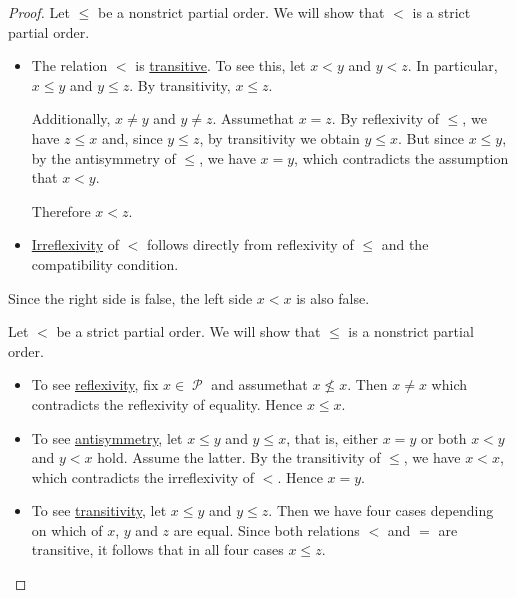 \begin{proof}
   Let \( \leq \) be a nonstrict partial order. We will show that \( < \) is a strict partial order.

  \begin{itemize}
    \item The relation \( < \) is \hyperref[def:binary_relation/transitive]{transitive}. To see this, let \( x < y \) and \( y < z \). In particular, \( x \leq y \) and \( y \leq z \). By transitivity, \( x \leq z \).

    Additionally, \( x \neq y \) and \( y \neq z \). Assume\DNE that \( x = z \). By reflexivity of \( \leq \), we have \( z \leq x \) and, since \( y \leq z \), by transitivity we obtain \( y \leq x \). But since \( x \leq y \), by the antisymmetry of \( \leq \), we have \( x = y \), which contradicts the assumption that \( x < y \).

    Therefore \( x < z \).

    \item \hyperref[def:binary_relation/irreflexive]{Irreflexivity} of \( < \) follows directly from reflexivity of \( \leq \) and the compatibility condition.
  \end{itemize}

  Since the right side is false, the left side \( x < x \) is also false.

   Let \( < \) be a strict partial order. We will show that \( \leq \) is a nonstrict partial order.

  \begin{itemize}
    \item To see \hyperref[def:binary_relation/reflexive]{reflexivity}, fix \( x \in \mscrP \) and assume\DNE that \( x \not\leq x \). Then \( x \neq x \) which contradicts the reflexivity of equality. Hence \( x \leq x \).

    \item To see \hyperref[def:binary_relation/antisymmetric]{antisymmetry}, let \( x \leq y \) and \( y \leq x \), that is, either \( x = y \) or both \( x < y \) and \( y < x \) hold. Assume the latter. By the transitivity of \( \leq \), we have \( x < x \), which contradicts the irreflexivity of \( < \). Hence \( x = y \).

    \item To see \hyperref[def:binary_relation/transitive]{transitivity}, let \( x \leq y \) and \( y \leq z \). Then we have four cases depending on which of \( x \), \( y \) and \( z \) are equal. Since both relations \( < \) and \( = \) are transitive, it follows that in all four cases \( x \leq z \).
  \end{itemize}
\end{proof}


